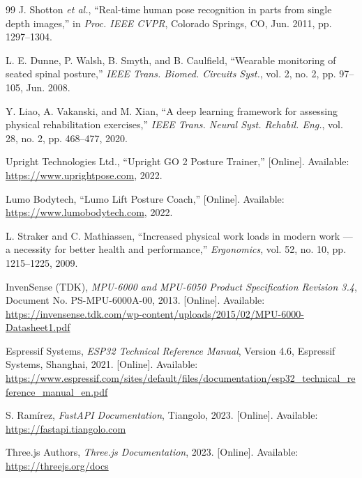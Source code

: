 \documentclass[12pt,a4paper]{report}
\begin{document}
\begin{thebibliography}{99}
J. Shotton \textit{et al.}, ``Real-time human pose recognition in parts from single depth images,'' in \textit{Proc. IEEE CVPR}, Colorado Springs, CO, Jun. 2011, pp. 1297--1304.

L. E. Dunne, P. Walsh, B. Smyth, and B. Caulfield, ``Wearable monitoring of seated spinal posture,'' \textit{IEEE Trans. Biomed. Circuits Syst.}, vol. 2, no. 2, pp. 97--105, Jun. 2008.

Y. Liao, A. Vakanski, and M. Xian, ``A deep learning framework for assessing physical rehabilitation exercises,'' \textit{IEEE Trans. Neural Syst. Rehabil. Eng.}, vol. 28, no. 2, pp. 468--477, 2020.

Upright Technologies Ltd., ``Upright GO 2 Posture Trainer,'' [Online]. Available: \url{https://www.uprightpose.com}, 2022.

Lumo Bodytech, ``Lumo Lift Posture Coach,'' [Online]. Available: \url{https://www.lumobodytech.com}, 2022.

L. Straker and C. Mathiassen, ``Increased physical work loads in modern work — a necessity for better health and performance,'' \textit{Ergonomics}, vol. 52, no. 10, pp. 1215--1225, 2009.

InvenSense (TDK), \textit{MPU-6000 and MPU-6050 Product Specification Revision 3.4}, Document No. PS-MPU-6000A-00, 2013. [Online]. Available: \url{https://invensense.tdk.com/wp-content/uploads/2015/02/MPU-6000-Datasheet1.pdf}

Espressif Systems, \textit{ESP32 Technical Reference Manual}, Version 4.6, Espressif Systems, Shanghai, 2021. [Online]. Available: \url{https://www.espressif.com/sites/default/files/documentation/esp32_technical_reference_manual_en.pdf}

S. Ram\'irez, \textit{FastAPI Documentation}, Tiangolo, 2023. [Online]. Available: \url{https://fastapi.tiangolo.com}

Three.js Authors, \textit{Three.js Documentation}, 2023. [Online]. Available: \url{https://threejs.org/docs}

\end{thebibliography}
\end{document}
